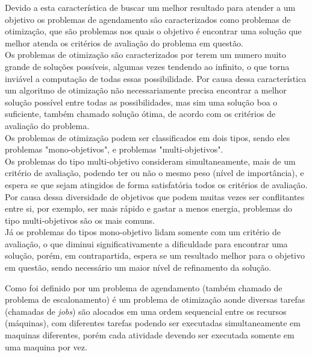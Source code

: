 Devido a esta característica de buscar um melhor resultado para atender a um objetivo os problemas de agendamento são caracterizados como problemas de otimização, que são problemas nos quais o objetivo é encontrar uma solução que melhor atenda os critérios de avaliação do problema em questão.\\
%
\indent Os problemas de otimização são caracterizados por terem um numero muito grande de soluções possíveis, algumas vezes tendendo ao infinito, o que torna inviável a computação de todas essas possibilidade. Por causa dessa característica um algoritmo de otimização não necessariamente precisa encontrar a melhor solução possível entre todas as possibilidades, mas sim uma solução boa o suficiente, também chamado solução ótima, de acordo com os critérios de avaliação do problema.\\
%
Os problemas de otimização podem ser classificados em dois tipos, sendo eles problemas "mono-objetivos", e problemas "multi-objetivos".\\
%
\indent Os problemas do tipo multi-objetivo consideram simultaneamente, mais de um critério de avaliação, podendo ter ou não o mesmo peso (nível de importância), e espera se que sejam atingidos de forma satisfatória todos os critérios de avaliação. Por causa dessa diversidade de objetivos que podem muitas vezes ser conflitantes entre si, por exemplo, ser mais rápido e gastar a menos energia, problemas do tipo multi-objetivos são os mais comuns.\\
%
\indent Já os problemas do tipos mono-objetivo lidam somente com um critério de avaliação, o que diminui significativamente a dificuldade para encontrar uma solução, porém, em contrapartida, espera se um resultado melhor para o objetivo em questão, sendo necessário um maior nível de refinamento da solução.

Como foi definido por \citeauthor{Bagchi1999} um problema de agendamento (também chamado de problema de escalonamento) é um problema de otimização aonde 
diversas tarefas (chamadas de \textit{jobs}) são alocados em uma ordem sequencial entre os recursos (máquinas), 
com diferentes tarefas podendo ser executadas simultaneamente
em maquinas diferentes, porém cada atividade devendo ser executada somente em uma maquina por vez.


